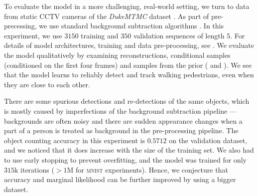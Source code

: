 To evaluate the model in a more challenging, real-world setting, we turn to data from static CCTV cameras of the \textit{DukeMTMC} dataset \citep{Ristani2016performance}. As part of pre-precessing, we use standard background subtraction algorithms \citep{Itseez2015opencv}. In this experiment, we use $3150$ training and $350$ validation sequences of length $5$. For details of model architectures, training and data pre-processing, see .
We evaluate the model qualitatively by examining reconstructions, conditional samples (conditioned on the first four frames) and samples from the prior ( and ).
We see that the model learns to reliably detect and track walking pedestrians, even when they are close to each other.

There are some spurious detections and re-detections of the same objects, which is mostly caused by imperfections of the background subtraction pipeline --- backgrounds are often noisy and there are sudden appearance changes when a part of a person is treated as background in the pre-processing pipeline.
The object counting accuracy in this experiment is $0.5712$ on the validation dataset, and we noticed that it does increase with the size of the training set. We also had to use early stopping to prevent overfitting, and the model was trained for only $315$k iterations ($>1$M for \textsc{mnist} experiments). Hence, we conjecture that accuracy and marginal likelihood can be further improved by using a bigger dataset.